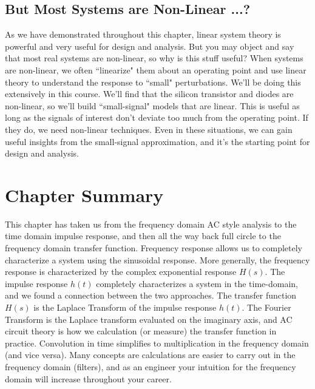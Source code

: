\subsection{But Most Systems are Non-Linear ...?}
As we have demonstrated throughout this chapter, linear system theory is powerful and very useful for design and analysis.  But you may object and say that most real systems are non-linear, so why is this stuff useful?
When systems are non-linear, we often ``linearize" them about an operating point and use linear theory to understand the response to ``small" perturbations.  We'll be doing this extensively in this course. We'll find that the silicon transistor and diodes are non-linear, so we'll build ``small-signal" models that are linear.  This is useful as long as the signals of interest don't deviate too much from the operating point.  If they do, we need non-linear techniques.  Even in these situations,  we can gain useful insights from the small-signal approximation, and it's the starting point for design and analysis.
\section{Chapter Summary}
This chapter has taken us from the frequency domain AC style analysis to the time domain impulse response, and then all the way back full circle to the frequency domain transfer function.
 Frequency response allows us to completely characterize a system using the sinusoidal response.
 More generally, the frequency response is characterized by the complex exponential response $H(s)$.   The impulse response $h(t)$ completely characterizes a system in the time-domain, and we found a connection between the two approaches.   The transfer function $H(s)$ is the Laplace Transform of the impulse response $h(t)$.  The Fourier Transform is the Laplace transform evaluated on the imaginary axis, and AC circuit theory is how we calculation (or measure) the transfer function in practice.   Convolution in time simplifies to multiplication in the frequency domain (and vice versa).
 Many concepts are calculations are easier to carry out in the frequency domain (filters), and as an engineer your intuition for the frequency domain will increase throughout your career.
 